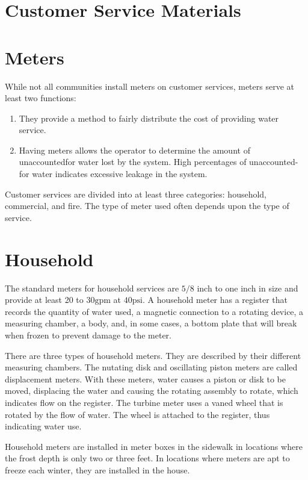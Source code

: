 \documentclass[10pt]{article}
\begin{document}
\section{Customer Service Materials}
\section{Meters}
While not all communities install meters on customer services, meters serve at least two functions:

\begin{enumerate}
  \item They provide a method to fairly distribute the cost of providing water service.

  \item Having meters allows the operator to determine the amount of unaccountedfor water lost by the system. High percentages of unaccounted-for water indicates excessive leakage in the system.

\end{enumerate}
Customer services are divided into at least three categories: household, commercial, and fire. The type of meter used often depends upon the type of service.

\section{Household}
The standard meters for household services are $5 / 8$ inch to one inch in size and provide at least 20 to $30 \mathrm{gpm}$ at $40 \mathrm{psi}$. A household meter has a register that records the quantity of water used, a magnetic connection to a rotating device, a measuring chamber, a body, and, in some cases, a bottom plate that will break when frozen to prevent damage to the meter.

There are three types of household meters. They are described by their different measuring chambers. The nutating disk and oscillating piston meters are called displacement meters. With these meters, water causes a piston or disk to be moved, displacing the water and causing the rotating assembly to rotate, which indicates flow on the register. The turbine meter uses a vaned wheel that is rotated by the flow of water. The wheel is attached to the register, thus indicating water use.

Household meters are installed in meter boxes in the sidewalk in locations where the frost depth is only two or three feet. In locations where meters are apt to freeze each winter, they are installed in the house.
\end{document}
